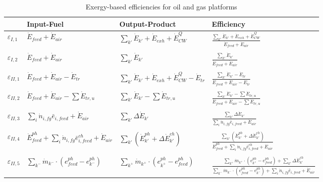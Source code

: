 \documentclass[times,3p]{elsarticle}
\begin{document}
\begin{table}[htbp]
\scriptsize
  \centering
  \caption{Exergy-based efficiencies for oil and gas platforms}
    \begin{tabular*}{\linewidth}{@{\extracolsep{\fill}}llll}
    \toprule
          & Input-Fuel  & Output-Product & Efficiency \\
	\toprule
	$\varepsilon_{I,1}$ & $\dot{E}_{feed}+\dot{E}_{air}$ & $\sum_{k'}\dot{E}_{k'}+\dot{E}_{exh}+\dot{E}^Q_{CW}$ & $\frac{\sum_{k'}\dot{E}_{k'}+\dot{E}_{exh}+\dot{E}^Q_{CW}}{\dot{E}_{feed}+\dot{E}_{air}}$ \\
    & & & \\	  
	$\varepsilon_{I,2}$ & $\dot{E}_{feed}+\dot{E}_{air}$ & $\sum_{k'}\dot{E}_{k'}$ & $\frac{\sum_{k'}\dot{E}_{k'}}{\dot{E}_{feed}+\dot{E}_{air}}$ \\
    & & & \\	  
	$\varepsilon_{II,1}$ & $\dot{E}_{feed}+\dot{E}_{air}-\dot{E}_{tr}$ & $\sum_{k'} \dot{E}_{k'}+\dot{E}_{exh}+\dot{E}^Q_{CW}-\dot{E}_{tr}$ & $\frac{\sum_{k'} \dot{E}_{k'}-\dot{E}_{tr}}{\dot{E}_{feed}+\dot{E}_{air}-\dot{E}_{tr}}$ \\
    & & & \\
	$\varepsilon_{II,2}$ & $\dot{E}_{feed}+\dot{E}_{air}-\sum \dot{E}_{tr,u}$& $\sum_{k'} \dot{E}_{k'}-\sum \dot{E}_{tr,u}$ & $\frac{\sum_{k'} \dot{E}_{k'}-\sum \dot{E}_{tr,u}}{\dot{E}_{feed}+\dot{E}_{air}-\sum \dot{E}_{tr,u}}$ \\
    & & & \\
    $\varepsilon_{II,3}$ & $\sum_i \dot{n}_{i,fg}\bar{e}_{i,feed}+\dot{E}_{air}$ & $\sum_{k'}\Delta\dot{E}_{k'}$ & $\frac{\sum_{k'}\Delta\dot{E}_{k'}}{\sum_i \dot{n}_{i,fg}\bar{e}_{i,feed}+\dot{E}_{air}}$ \\
	& & & \\
	$\varepsilon_{II,4}$ & $\dot{E}^{ph}_{feed}+\sum_i \dot{n}_{i,fg}\bar{e}^{ch}_{i,feed}+\dot{E}_{air}$   &  $\sum_{k'}\left(\dot{E}^{ph}_{k'}+\Delta{\dot{E}}^{ch}_{k'}\right)$ & $\frac{\sum_{k'}\left(\dot{E}^{ph}_{k'}+\Delta{\dot{E}}^{ch}_{k'}\right)}{\dot{E}^{ph}_{feed}+\sum_i \dot{n}_{i,fg}\bar{e}^{ch}_{i,feed}+\dot{E}_{air}}$ \\
	& & & \\
	$\varepsilon_{II,5}$ & $\sum_{k^{-}} \dot{m}_{k^{-}}\cdot(e_{feed}^{ph}-e_{k^{-}}^{ph})$ & $\sum_{k^{+}}\dot{m}_{k^{+}}\cdot(e_{k^{+}}^{ph}-e_{feed}^{ph})$ & $\frac{\sum_{k^{+}}\dot{m}_{k^{+}}\cdot(e_{k^{+}}^{ph}-e_{feed}^{ph})+\sum_{k'}\Delta{\dot{E}}^{ch}_{k'}}{\sum_{k^{-}} \dot{m}_{k^{-}}\cdot(e_{feed}^{ph}-e_{k^{-}}^{ph})+\sum_i \dot{n}_{i,fg}\bar{e}_{i,feed}+\dot{E}_{air}}$ \\

\end{tabular*}
\end{table}
\end{document}
